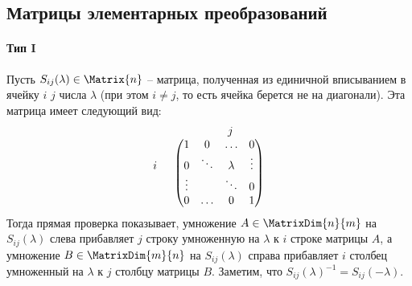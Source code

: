 \subsection{Матрицы элементарных преобразований}

\paragraph{Тип I}
Пусть $S_{ij}(\lambda)\in\Matrix{n}$ -- матрица, полученная из единичной вписыванием в ячейку $i$ $j$ числа $\lambda$ (при этом $i\neq j$, то есть ячейка берется не на диагонали).
Эта матрица имеет следующий вид:
\[
\begin{tabular}{cc}
{}&{\quad \quad $j$}\\
{
$
\begin{matrix}
{}\\{i}\\{}\\{}
\end{matrix}
$}&{
$
\begin{pmatrix}
{1}&{0}&{\ldots}&{0}\\
{0}&{\ddots}&{\lambda}&{\vdots}\\
{\vdots}&{}&{\ddots}&{0}\\
{0}&{\ldots}&{0}&{1}\\
\end{pmatrix}
$
}
\end{tabular}
\]
Тогда прямая проверка показывает, умножение $A\in\MatrixDim{n}{m}$ на $S_{ij}(\lambda)$ слева прибавляет $j$ строку умноженную на $\lambda$ к $i$ строке матрицы $A$, а умножение $B\in\MatrixDim{m}{n}$ на $S_{ij}(\lambda)$ справа прибавляет $i$ столбец умноженный на $\lambda$ к $j$ столбцу матрицы $B$.
Заметим, что $S_{ij}(\lambda)^{-1} = S_{ij}(-\lambda)$.

